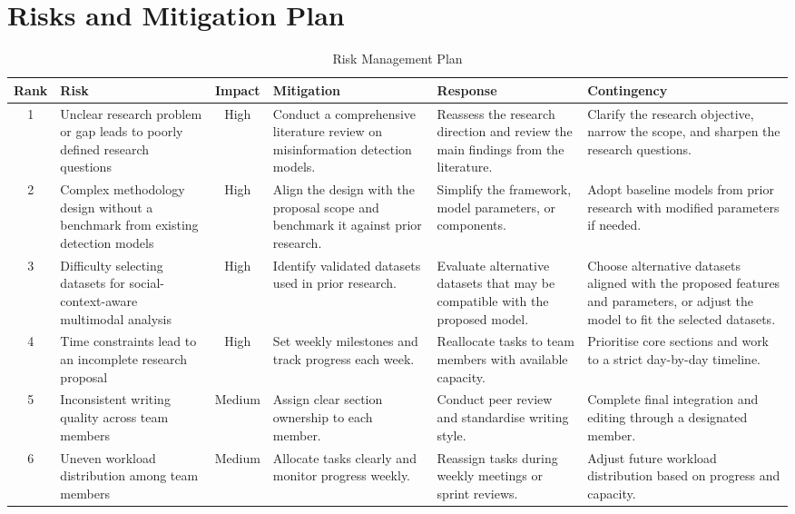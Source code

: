 \section{Risks and Mitigation Plan}
\label{sec:risk}

\begin{table}[H]
\centering
\footnotesize
\setlength{\tabcolsep}{4pt}
\renewcommand{\arraystretch}{1.2}

\begin{tabular}{|c|p{3.2cm}|c|p{3.2cm}|p{3.2cm}|p{3.2cm}|}
\hline
\textbf{Rank} & \textbf{Risk} & \textbf{Impact} & \textbf{Mitigation} & \textbf{Response} & \textbf{Contingency} \\
\hline

1 
& Unclear research problem or gap leads to poorly defined research questions 
& High 
& Conduct a comprehensive literature review on misinformation detection models. 
& Reassess the research direction and review the main findings from the literature. 
& Clarify the research objective, narrow the scope, and sharpen the research questions. \\
\hline

2 
& Complex methodology design without a benchmark from existing detection models 
& High 
& Align the design with the proposal scope and benchmark it against prior research. 
& Simplify the framework, model parameters, or components. 
& Adopt baseline models from prior research with modified parameters if needed. \\
\hline

3 
& Difficulty selecting datasets for social-context-aware multimodal analysis 
& High 
& Identify validated datasets used in prior research. 
& Evaluate alternative datasets that may be compatible with the proposed model. 
& Choose alternative datasets aligned with the proposed features and parameters, or adjust the model to fit the selected datasets. \\
\hline

4 
& Time constraints lead to an incomplete research proposal 
& High 
& Set weekly milestones and track progress each week. 
& Reallocate tasks to team members with available capacity. 
& Prioritise core sections and work to a strict day-by-day timeline. \\
\hline

5 
& Inconsistent writing quality across team members 
& Medium 
& Assign clear section ownership to each member. 
& Conduct peer review and standardise writing style. 
& Complete final integration and editing through a designated member. \\
\hline

6 
& Uneven workload distribution among team members 
& Medium 
& Allocate tasks clearly and monitor progress weekly. 
& Reassign tasks during weekly meetings or sprint reviews. 
& Adjust future workload distribution based on progress and capacity. \\
\hline

\end{tabular}

\caption{Risk Management Plan}
\label{tab:risk_management_plan}
\end{table}
